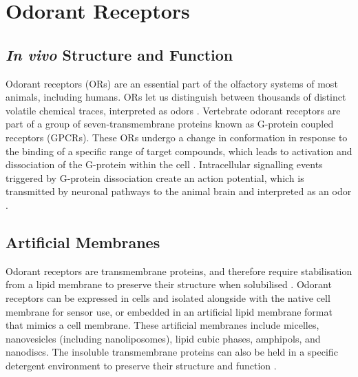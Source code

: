 \documentclass[
  a4paper,
]{scrbook}
\begin{document}
\hypertarget{sec-odorant-receptors}{%
\section{Odorant Receptors}\label{sec-odorant-receptors}}

\hypertarget{in-vivo-structure-and-function}{%
\subsection{\texorpdfstring{\emph{In vivo} Structure and
Function}{In vivo Structure and Function}}\label{in-vivo-structure-and-function}}

Odorant receptors (ORs) are an essential part of the olfactory systems
of most animals, including humans. ORs let us distinguish between
thousands of distinct volatile chemical traces, interpreted as odors
\autocite{Buck1991,Dung2018}. Vertebrate odorant receptors are part of a
group of seven-transmembrane proteins known as G-protein coupled
receptors (GPCRs). These ORs undergo a change in conformation in
response to the binding of a specific range of target compounds, which
leads to activation and dissociation of the G-protein within the cell
\autocite{Buck1991,Dung2018,Zhang2021}. Intracellular signalling events
triggered by G-protein dissociation create an action potential, which is
transmitted by neuronal pathways to the animal brain and interpreted as
an odor \autocite{Buck1991,Dung2018}.

\hypertarget{sec-artificial-membranes}{%
\subsection{Artificial Membranes}\label{sec-artificial-membranes}}

Odorant receptors are transmembrane proteins, and therefore require
stabilisation from a lipid membrane to preserve their structure when
solubilised \autocite{Fruh2011,Dung2018}. Odorant receptors can be
expressed in cells and isolated alongside with the native cell membrane
for sensor use, or embedded in an artificial lipid membrane format that
mimics a cell membrane. These artificial membranes include micelles,
nanovesicles (including nanoliposomes), lipid cubic phases, amphipols,
and nanodiscs. The insoluble transmembrane proteins can also be held in
a specific detergent environment to preserve their structure and
function \autocite{Fruh2011,Dung2018}.
\end{document}
